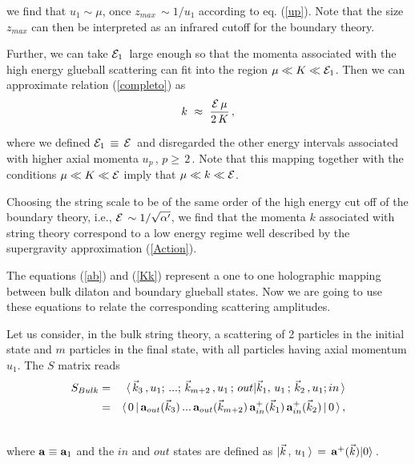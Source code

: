 \documentclass[a4paper,twocolumn,prd,groupedaddress,nofootinbib]{revtex4}
\begin{document}
\noindent we find that $u_1 \sim \mu $, once $z_{max} \,\sim 1/u_1$
according to eq. (\ref{up}). Note that the size $z_{max}$ 
can then be interpreted as
an infrared cutoff for the boundary theory.

Further, we can take  ${\cal E}_1\,$ large enough so that the 
momenta associated with the high energy glueball scattering can 
fit into the region $\mu \ll K \ll {\cal E}_1$. 
Then we can  approximate relation (\ref{completo}) as
\begin{equation}
\label{Kk}
k \,\,\approx\,\, { {\cal E}\, \mu  \over 2 \, K}\,, 
\end{equation}


\noindent where we defined ${\cal E}_1\,\equiv\,{\cal E}\,$ and 
disregarded the other energy intervals
associated with higher axial momenta $u_p\,,\,p\ge\,2\,$.
Note that this mapping together with the conditions 
$\mu \ll K \ll {\cal E} $ imply  that $\mu \ll k \ll {\cal E} $.

Choosing the string scale to  be of the same order of the high 
energy cut off of the boundary theory, i.e., 
${\cal E}\,\sim 1/ \sqrt{\alpha^\prime}$,
we find that the momenta $k$ associated with string theory 
correspond to a low energy
regime well described by the supergravity approximation (\ref{Action}).

The equations (\ref{ab}) and (\ref{Kk})  represent a one to one 
holographic mapping
between bulk dilaton  and boundary glueball states.
Now we are going to use these equations to relate the corresponding 
scattering amplitudes.

Let us consider, in the bulk string theory, a scattering  of
2 particles in the initial state and $m$ particles in the final state,
with all particles having axial  momentum  $u_1$. The $S$ matrix reads 
\begin{eqnarray} 
S_{Bulk} &=&  \langle \, {\vec k}_3\,,u_1;\,...; \,{\vec k}_{m+2}\,,u_1\,
;\,out \vert {\vec k}_1,\,u_1\, 
;\,{\vec k}_2 \,,u_1;in\,\rangle \nonumber\\
&=&  \langle \, 0\,\vert \,{\bf a}_{out} ( {\vec k}_3 )\,... \,{\bf a}_{out}
 ({\vec k}_{m+2}) \,  {\bf a}^+_{in }
( {\vec k}_1) \,{\bf a}^+_{in} ({\vec k}_2) \,\vert \, 0\, \rangle 
\,,\nonumber\\
& &
\end{eqnarray}


\noindent where ${\bf a} \equiv {\bf a}_1$ and the $in$ and $out$ 
states are defined as 
$ \vert \vec k \,,\,u_1\,\rangle 
\,=\, {\bf a}^+ (\vec k ) \vert 0 \rangle \,$.
\end{document}
